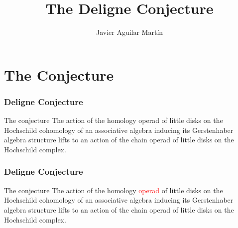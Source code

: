 \documentclass{beamer}
\title{The Deligne Conjecture}
\author{Javier Aguilar Martín}
\institute{Universidad de Sevilla}
\date{}
\theoremstyle{definition}
\begin{document}
\frame{\titlepage}
%
% 
% 
% 

% 



\newcommand{\seti}{\setcounter{saveenumi}{\value{enumi}}}
\newcommand{\conti}{\setcounter{enumi}{\value{saveenumi}}}


%	
%
\section{The Conjecture}
\begin{frame}
	\frametitle{Deligne Conjecture}
	\begin{block}{The conjecture}
	The action of the homology operad of little disks on the Hochschild cohomology of an associative algebra inducing its Gerstenhaber algebra structure lifts to an action of the chain operad of little disks on the Hochschild complex.
	\end{block}
	
\end{frame}

\begin{frame}
		\frametitle{Deligne Conjecture}
	\begin{block}{The conjecture}
	The action of the homology \textcolor{red}{operad} of little disks on the Hochschild cohomology of an associative algebra inducing its Gerstenhaber algebra structure lifts to an action of the chain operad of little disks on the Hochschild complex.
\end{block}
\end{frame}
\end{document}
